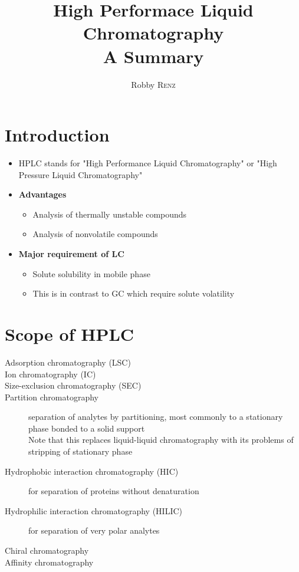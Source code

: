 \documentclass[a4paper, 12pt]{article}
\author{Robby \textsc{Renz}}
\title{\textbf{High Performace Liquid Chromatography} \\ A Summary}
\begin{document}
\maketitle
\newpage

\tableofcontents
\listoffigures
\listoftables
\newpage

\section{Introduction}
\begin{itemize}
	\item HPLC stands for "High Performance Liquid Chromatography" or "High Pressure Liquid Chromatography"
	\item \textbf{Advantages}
	\begin{itemize}
		\item Analysis of thermally unstable compounds
		\item Analysis of nonvolatile compounds
	\end{itemize}
	\item \textbf{Major requirement of LC}
	\begin{itemize}
		\item Solute solubility in mobile phase
		\item This is in contrast to GC which require solute volatility
	\end{itemize}
\end{itemize}


\section{Scope of HPLC}
\begin{description}
	\item[Adsorption chromatography (LSC)]
	\item[Ion chromatography (IC)]
	\item[Size-exclusion chromatography (SEC)]
	\item[Partition chromatography] separation of analytes by partitioning, most commonly to a stationary phase bonded to a solid support \\ Note that this replaces liquid-liquid chromatography with its problems of stripping of stationary phase
	\item[Hydrophobic interaction chromatography (HIC)] for separation of proteins without denaturation
	\item[Hydrophilic interaction chromatography (HILIC)] for separation of very polar analytes
	\item[Chiral chromatography]
	\item[Affinity chromatography]
\end{description}
\end{document}
